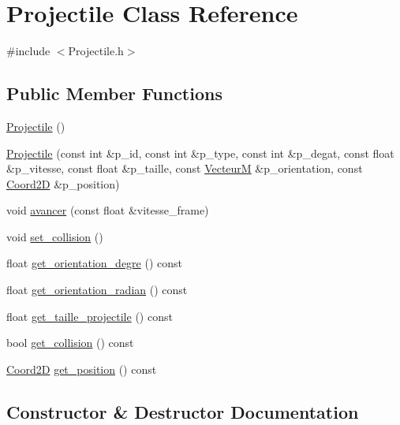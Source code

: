 \hypertarget{classProjectile}{}\section{Projectile Class Reference}
\label{classProjectile}


{\ttfamily \#include $<$Projectile.\+h$>$}

\subsection*{Public Member Functions}
\begin{DoxyCompactItemize}
\item 
\hyperlink{classProjectile_ac536ed2aad56af866a2078b9a85aa16d}{Projectile} ()
\item 
\hyperlink{classProjectile_a40d61808d12cb84127d768ead95d7b24}{Projectile} (const int \&p\+\_\+id, const int \&p\+\_\+type, const int \&p\+\_\+degat, const float \&p\+\_\+vitesse, const float \&p\+\_\+taille, const \hyperlink{classVecteurM}{VecteurM} \&p\+\_\+orientation, const \hyperlink{classCoord2D}{Coord2D} \&p\+\_\+position)
\item 
void \hyperlink{classProjectile_a7284639815c2d8f7d852ff3872851fa5}{avancer} (const float \&vitesse\+\_\+frame)
\item 
void \hyperlink{classProjectile_a137391002869c50a97504992033915ac}{set\+\_\+collision} ()
\item 
float \hyperlink{classProjectile_af114e853c019123fd3cbf208352afbd5}{get\+\_\+orientation\+\_\+degre} () const 
\item 
float \hyperlink{classProjectile_a03627709f7fa134cae85c7480e8b8de4}{get\+\_\+orientation\+\_\+radian} () const 
\item 
float \hyperlink{classProjectile_a77d1976107d1c7a15e7ba5298d80defb}{get\+\_\+taille\+\_\+projectile} () const 
\item 
bool \hyperlink{classProjectile_a4e22cdf491c89cb27ebd31532afdd753}{get\+\_\+collision} () const 
\item 
\hyperlink{classCoord2D}{Coord2D} \hyperlink{classProjectile_a5576e84397fff82a93ee85c5cc80591c}{get\+\_\+position} () const 
\end{DoxyCompactItemize}


\subsection{Constructor \& Destructor Documentation}
